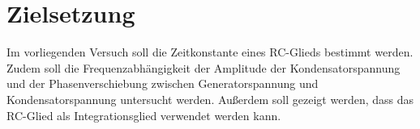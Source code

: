 \section{Zielsetzung}
\label{sec:Zielsetzung}
Im vorliegenden Versuch soll die Zeitkonstante eines RC-Glieds bestimmt werden. Zudem soll die Frequenzabhängigkeit der Amplitude der Kondensatorspannung und der Phasenverschiebung zwischen Generatorspannung und Kondensatorspannung
untersucht werden. Außerdem soll gezeigt werden, dass das RC-Glied als Integrationsglied verwendet werden kann.
